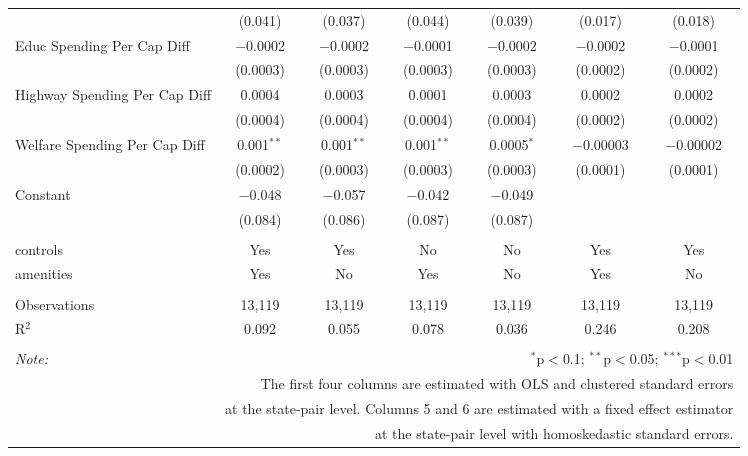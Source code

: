 \begin{table}[!htbp]
\begin{tabular}{@{\extracolsep{5pt}}lcccccc}
  & (0.041) & (0.037) & (0.044) & (0.039) & (0.017) & (0.018) \\ 
  Educ Spending Per Cap Diff & $-$0.0002 & $-$0.0002 & $-$0.0001 & $-$0.0002 & $-$0.0002 & $-$0.0001 \\ 
  & (0.0003) & (0.0003) & (0.0003) & (0.0003) & (0.0002) & (0.0002) \\ 
  Highway Spending Per Cap Diff & 0.0004 & 0.0003 & 0.0001 & 0.0003 & 0.0002 & 0.0002 \\ 
  & (0.0004) & (0.0004) & (0.0004) & (0.0004) & (0.0002) & (0.0002) \\ 
  Welfare Spending Per Cap Diff & 0.001$^{**}$ & 0.001$^{**}$ & 0.001$^{**}$ & 0.0005$^{*}$ & $-$0.00003 & $-$0.00002 \\ 
  & (0.0002) & (0.0003) & (0.0003) & (0.0003) & (0.0001) & (0.0001) \\ 
  Constant & $-$0.048 & $-$0.057 & $-$0.042 & $-$0.049 &  &  \\ 
  & (0.084) & (0.086) & (0.087) & (0.087) &  &  \\ 
 \hline \\[-1.8ex] 
controls & Yes & Yes & No & No & Yes & Yes \\ 
amenities & Yes & No & Yes & No & Yes & No \\ 
\hline \\[-1.8ex] 
Observations & 13,119 & 13,119 & 13,119 & 13,119 & 13,119 & 13,119 \\ 
R$^{2}$ & 0.092 & 0.055 & 0.078 & 0.036 & 0.246 & 0.208 \\ 
\hline 
\hline \\[-1.8ex] 
\textit{Note:}  & \multicolumn{6}{r}{$^{*}$p$<$0.1; $^{**}$p$<$0.05; $^{***}$p$<$0.01} \\ 
 & \multicolumn{6}{r}{The first four columns are estimated with OLS and clustered standard errors} \\ 
 & \multicolumn{6}{r}{at the state-pair level. Columns 5 and 6 are estimated with a fixed effect estimator} \\ 
 & \multicolumn{6}{r}{at the state-pair level with homoskedastic standard errors.} \\ 
\end{tabular} 
\end{table} 
